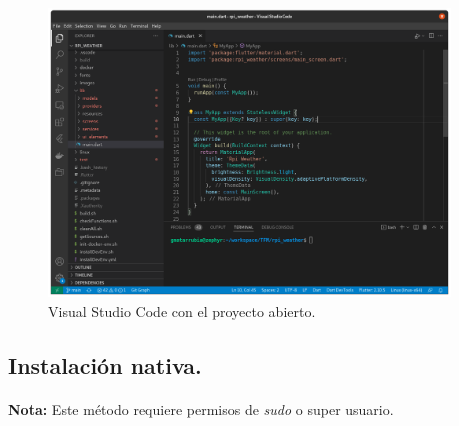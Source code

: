 \begin{figure}[H]
    \centering
    \includegraphics[width=0.95\textwidth]{imgs/vscode-ready}
	\caption[Visual Studio Code]{Visual Studio Code con el proyecto abierto.}
	\label{imgs:vscode-ready}
\end{figure}

\subsection{Instalación nativa.}

\paragraph{}\textbf{Nota:} Este método requiere permisos de \emph{sudo} o super usuario.

